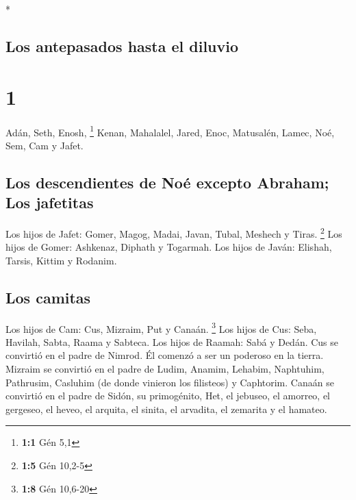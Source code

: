 \begin{paracol}{2} \switchcolumn[0]*

\hypertarget{los-antepasados-hasta-el-diluvio}{%
\subsection{Los antepasados \hspace{0pt}\hspace{0pt}hasta el
diluvio}\label{los-antepasados-hasta-el-diluvio}}

\hypertarget{section}{%
\section{1}\label{section}}

 Adán, Seth, Enosh, \footnote{\textbf{1:1} Gén 5,1}
 Kenan, Mahalalel, Jared,  Enoc, Matusalén,
Lamec,  Noé, Sem, Cam y Jafet.

\hypertarget{los-descendientes-de-nouxe9-excepto-abraham-los-jafetitas}{%
\subsection{Los descendientes de Noé excepto Abraham; Los
jafetitas}\label{los-descendientes-de-nouxe9-excepto-abraham-los-jafetitas}}

 Los hijos de Jafet: Gomer, Magog, Madai, Javan, Tubal,
Meshech y Tiras. \footnote{\textbf{1:5} Gén 10,2-5}  Los
hijos de Gomer: Ashkenaz, Diphath y Togarmah.  Los hijos
de Javán: Elishah, Tarsis, Kittim y Rodanim.

\hypertarget{los-camitas}{%
\subsection{Los camitas}\label{los-camitas}}

 Los hijos de Cam: Cus, Mizraim, Put y Canaán. \footnote{\textbf{1:8}
  Gén 10,6-20}  Los hijos de Cus: Seba, Havilah, Sabta,
Raama y Sabteca. Los hijos de Raamah: Sabá y Dedán.  Cus
se convirtió en el padre de Nimrod. Él comenzó a ser un poderoso en la
tierra.  Mizraim se convirtió en el padre de Ludim,
Anamim, Lehabim, Naphtuhim,  Pathrusim, Casluhim (de
donde vinieron los filisteos) y Caphtorim.  Canaán se
convirtió en el padre de Sidón, su primogénito, Het,  el
jebuseo, el amorreo, el gergeseo,  el heveo, el arquita,
el sinita,  el arvadita, el zemarita y el hamateo.


\end{paracol}
